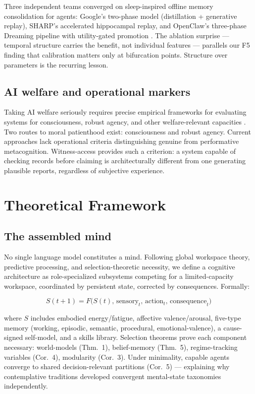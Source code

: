 \documentclass[11pt]{article}
\begin{document}
Three independent teams converged on sleep-inspired offline memory
consolidation for agents: Google's two-phase model (distillation +
generative replay), SHARP's accelerated hippocampal replay, and OpenClaw's
three-phase Dreaming pipeline with utility-gated promotion
\citep{octml2026dreaming}. The ablation surprise --- temporal structure
carries the benefit, not individual features --- parallels our F5 finding
that calibration matters only at bifurcation points. Structure over
parameters is the recurring lesson.

\subsection{AI welfare and operational markers}

Taking AI welfare seriously requires precise empirical frameworks for
evaluating systems for consciousness, robust agency, and other
welfare-relevant capacities \citep{long2024welfare}. Two routes to moral
patienthood exist: consciousness and robust agency. Current approaches
lack operational criteria distinguishing genuine from performative
metacognition. Witness-access provides such a criterion: a system capable
of checking records before claiming is architecturally different from one
generating plausible reports, regardless of subjective experience.

\section{Theoretical Framework}\label{sec:theory}

\subsection{The assembled mind}

No single language model constitutes a mind. Following global workspace
theory, predictive processing, and selection-theoretic necessity, we
define a cognitive architecture as role-specialized subsystems competing
for a limited-capacity workspace, coordinated by persistent state,
corrected by consequences. Formally:

\begin{equation}
S(t{+}1) = F\bigl(S(t),\,\mathrm{sensory}_t,\,\mathrm{action}_t,\,
\mathrm{consequence}_t\bigr)
\label{eq:loop}
\end{equation}

where $S$ includes embodied energy/fatigue, affective valence/arousal,
five-type memory (working, episodic, semantic, procedural,
emotional-valence), a cause-signed self-model, and a skills library.
Selection theorems prove each component necessary: world-models
(Thm.~1), belief-memory (Thm.~5), regime-tracking variables (Cor.~4),
modularity (Cor.~3). Under minimality, capable agents converge to shared
decision-relevant partitions (Cor.~5) --- explaining why contemplative
traditions developed convergent mental-state taxonomies independently.
\end{document}

